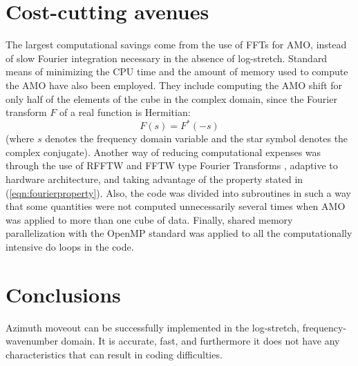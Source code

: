 \section{Cost-cutting avenues}
The largest computational savings come from the use of FFTs for AMO,
instead of slow Fourier integration necessary in the absence of
log-stretch. Standard means of minimizing the CPU time and the amount of memory used
to compute the AMO have also been employed. They include computing the AMO
shift for only half of the elements of the cube in the complex domain,
since the Fourier transform $F$ of a real function is Hermitian:
\begin{equation}
\label{eqn:fourierproperty}
F(s)=F^{*}(-s)
\end{equation}
(where $s$ denotes the frequency domain variable and the star symbol
denotes the complex conjugate). Another way of reducing computational
expenses was through the use of RFFTW and FFTW type Fourier
Transforms \cite{fftw}, adaptive to hardware architecture, and
taking advantage of 
the property stated in (\ref{eqn:fourierproperty}). Also, the code was
divided into subroutines in such a way that some quantities
were not computed unnecessarily several times when AMO was applied to
more than one cube of data. Finally, shared memory parallelization
with the OpenMP standard was applied to all the computationally
intensive do loops in the code.

\section{Conclusions}
Azimuth moveout can be successfully implemented in the log-stretch,
frequency-wavenumber domain. It is accurate,
fast, and furthermore it does not have any characteristics that can
result in coding difficulties. 



